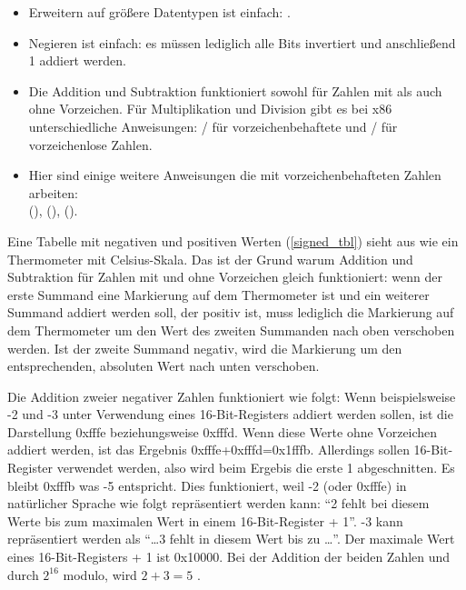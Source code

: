 \begin{itemize}
\item Erweitern auf größere Datentypen ist einfach:
.

\label{sec:signednumbers:negation}
\item Negieren ist einfach: es müssen lediglich alle Bits invertiert und anschließend 1 addiert werden.


\item 
	Die Addition und Subtraktion funktioniert sowohl für Zahlen mit als auch ohne Vorzeichen.
	Für Multiplikation und Division gibt es bei x86 unterschiedliche Anweisungen:
	/ für vorzeichenbehaftete und / für vorzeichenlose Zahlen.
\item
	Hier sind einige weitere Anweisungen die mit vorzeichenbehafteten Zahlen arbeiten:\\
	 (),  (),  ().
\end{itemize}

Eine Tabelle mit negativen und positiven Werten (\ref{signed_tbl}) sieht aus wie ein Thermometer mit Celsius-Skala.
Das ist der Grund warum Addition und Subtraktion für Zahlen mit und ohne Vorzeichen gleich funktioniert:
wenn der erste Summand eine Markierung auf dem Thermometer ist und ein weiterer Summand addiert werden soll,
der positiv ist, muss lediglich die Markierung auf dem Thermometer um den Wert des zweiten Summanden nach
oben verschoben werden.
Ist der zweite Summand negativ, wird die Markierung um den entsprechenden, absoluten Wert nach unten verschoben.

Die Addition zweier negativer Zahlen funktioniert wie folgt:
Wenn beispielsweise -2 und -3 unter Verwendung eines 16-Bit-Registers addiert werden sollen,
ist die Darstellung 0xfffe beziehungsweise 0xfffd.
Wenn diese Werte ohne Vorzeichen addiert werden, ist das Ergebnis 0xfffe+0xfffd=0x1fffb.
Allerdings sollen 16-Bit-Register verwendet werden, also wird beim Ergebis die erste 1 abgeschnitten.
Es bleibt 0xfffb was -5 entspricht.
Dies funktioniert, weil -2 (oder 0xfffe) in natürlicher Sprache wie folgt repräsentiert werden kann:
``2 fehlt bei diesem Werte bis zum maximalen Wert in einem 16-Bit-Register + 1''.
-3 kann repräsentiert werden als ``\dots 3 fehlt in diesem Wert bis zu \dots''.
Der maximale Wert eines 16-Bit-Registers + 1 ist 0x10000.
Bei der Addition der beiden Zahlen und   durch $2^{16}$ modulo,
wird $2+3=5$ .




